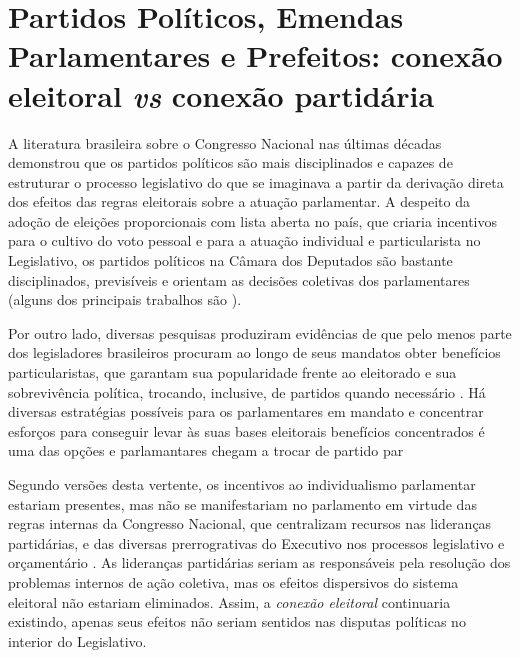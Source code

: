 \chapter{Partidos Políticos, Emendas Parlamentares e Prefeitos: conexão eleitoral \emph{vs} conexão partidária}
\label{cap:emendas}

A literatura brasileira sobre o Congresso Nacional nas últimas décadas demonstrou que os partidos políticos são mais disciplinados e capazes de estruturar o processo legislativo do que se imaginava a partir da derivação direta dos efeitos das regras eleitorais sobre a atuação parlamentar. A despeito da adoção de eleições proporcionais com lista aberta no país, que criaria incentivos para o cultivo do voto pessoal e para a atuação individual e particularista no Legislativo, os partidos políticos na Câmara dos Deputados são bastante disciplinados, previsíveis e orientam as decisões coletivas dos parlamentares (alguns dos principais trabalhos são \citealp*{AmorimNeto2001, AmorimNeto2003, Figueiredo1999a, Figueiredo2000, Figueiredo2002, Figueiredo2008, Limongi2005, Santos1997, Santos1999, Santos2002}).

Por outro lado, diversas pesquisas produziram evidências de que pelo menos parte dos legisladores brasileiros procuram ao longo de seus mandatos obter benefícios particularistas, que garantam sua popularidade frente ao eleitorado e sua sobrevivência política, trocando, inclusive, de partidos quando necessário \citep{Samuels1997, Ames2011, Mainwaring1999, Pereira2001, Pereira2007, Desposato2006}. Há diversas estratégias possíveis para os parlamentares em mandato e concentrar esforços para conseguir levar às suas bases eleitorais benefícios concentrados é uma das opções \citep{Leoni2003, Lemos2011, Desposato } e parlamantares chegam a trocar de partido par

Segundo versões desta vertente, os incentivos ao individualismo parlamentar estariam presentes, mas não se manifestariam no parlamento em virtude das regras internas da Congresso Nacional, que centralizam recursos nas lideranças partidárias, e das diversas prerrogrativas do Executivo nos processos legislativo e orçamentário \citep{Pereira2002, Pereira2003}. As lideranças partidárias seriam as responsáveis pela resolução dos problemas internos de ação coletiva, mas os efeitos dispersivos do sistema eleitoral não estariam eliminados. Assim, a \emph{conexão eleitoral} continuaria existindo, apenas seus efeitos não seriam sentidos nas disputas políticas no interior do Legislativo.

